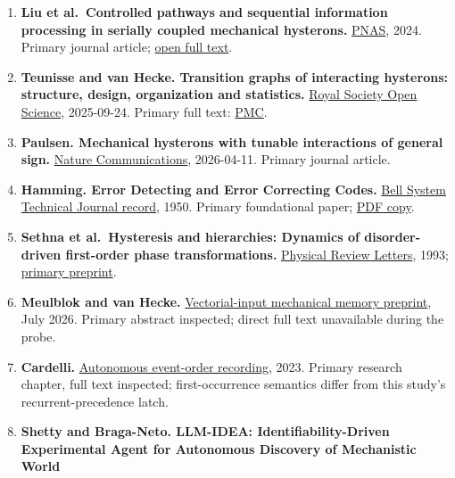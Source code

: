 \documentclass[
  11pt,
]{article}
\begin{document}
\begin{enumerate}
{  metamaterials.}
  \href{https://www.nature.com/articles/s41467-024-47780-w}{Nature
  Communications}, 2024. Primary journal article;
  \href{https://pmc.ncbi.nlm.nih.gov/articles/PMC11109184/}{open full
  text}.
\item
  \textbf{Liu et al.~Controlled pathways and sequential information
  processing in serially coupled mechanical hysterons.}
  \href{https://doi.org/10.1073/pnas.2308414121}{PNAS}, 2024. Primary
  journal article;
  \href{https://pmc.ncbi.nlm.nih.gov/articles/PMC11145188/}{open full
  text}.
\item
  \textbf{Teunisse and van Hecke. Transition graphs of interacting
  hysterons: structure, design, organization and statistics.}
  \href{https://doi.org/10.1098/rsos.250753}{Royal Society Open
  Science}, 2025-09-24. Primary full text:
  \href{https://pmc.ncbi.nlm.nih.gov/articles/PMC12457013/}{PMC}.
\item
  \textbf{Paulsen. Mechanical hysterons with tunable interactions of
  general sign.}
  \href{https://www.nature.com/articles/s41467-026-70913-2}{Nature
  Communications}, 2026-04-11. Primary journal article.
\item
  \textbf{Hamming. Error Detecting and Error Correcting Codes.}
  \href{https://www.nokia.com/bell-labs/publications-and-media/publications/error-detecting-and-error-correcting-codes/}{Bell
  System Technical Journal record}, 1950. Primary foundational paper;
  \href{https://zoo.cs.yale.edu/classes/cs323/doc/Hamming.pdf}{PDF
  copy}.
\item
  \textbf{Sethna et al.~Hysteresis and hierarchies: Dynamics of
  disorder-driven first-order phase transformations.}
  \href{https://doi.org/10.1103/PhysRevLett.70.3347}{Physical Review
  Letters}, 1993;
  \href{https://arxiv.org/html/cond-mat/9210018v1}{primary preprint}.
\item
  \textbf{Meulblok and van Hecke.}
  \href{https://arxiv.org/abs/2607.11179}{Vectorial-input mechanical
  memory preprint}, July 2026. Primary abstract inspected; direct full
  text unavailable during the probe.
\item
  \textbf{Cardelli.}
  \href{https://link.springer.com/chapter/10.1007/978-981-19-9891-1_17}{Autonomous
  event-order recording}, 2023. Primary research chapter, full text
  inspected; first-occurrence semantics differ from this study's
  recurrent-precedence latch.
\item
  \textbf{Shetty and Braga-Neto. LLM-IDEA: Identifiability-Driven
  Experimental Agent for Autonomous Discovery of Mechanistic World
}
\end{enumerate}
\end{document}
